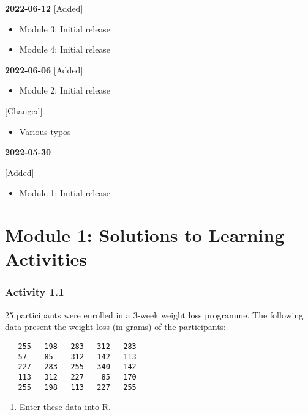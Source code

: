 \documentclass[
]{memoir}
\providecommand{\tightlist}{%
  \setlength{\itemsep}{0pt}\setlength{\parskip}{0pt}}
\begin{document}
\textbf{2022-06-12}
{[}Added{]}

\begin{itemize}
\tightlist
\item
  Module 3: Initial release
\item
  Module 4: Initial release
\end{itemize}

\textbf{2022-06-06}
{[}Added{]}

\begin{itemize}
\tightlist
\item
  Module 2: Initial release
\end{itemize}

{[}Changed{]}

\begin{itemize}
\tightlist
\item
  Various typos
\end{itemize}

\textbf{2022-05-30}

{[}Added{]}

\begin{itemize}
\tightlist
\item
  Module 1: Initial release
\end{itemize}

\hypertarget{module-1-solutions-to-learning-activities}{%
\chapter*{Module 1: Solutions to Learning Activities}\label{module-1-solutions-to-learning-activities}}

\hypertarget{activity-1.1}{%
\subsection*{Activity 1.1}\label{activity-1.1}}

25 participants were enrolled in a 3-week weight loss programme. The following data present the weight loss (in grams) of the participants:

\begin{verbatim}
   255   198   283   312   283
   57    85    312   142   113
   227   283   255   340   142
   113   312   227    85   170
   255   198   113   227   255
\end{verbatim}

\begin{enumerate}
\def\labelenumi{\alph{enumi})}
\tightlist
\item
  Enter these data into R.
\end{enumerate}
\end{document}
